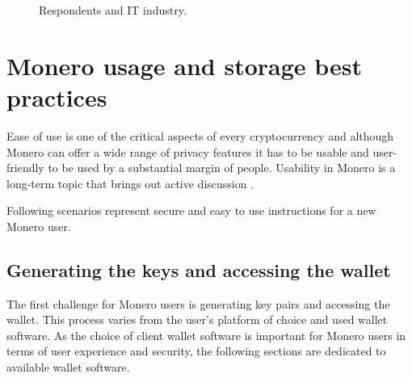 \documentclass[
  printed, %
  table,   %
  lof,     %
  lot,     %
           oneside, color
]{fithesis3}
\begin{document}
\begin{center}
\begin{figure}[H]
\caption{Respondents and IT industry.}
\label{chart:itindustryuserresearch}\end{figure}\end{center}

\chapter{Monero usage and storage best practices}
Ease of use is one of the critical aspects of every cryptocurrency and although Monero can offer a wide range of privacy features it has to be usable and user-friendly to be used by a substantial margin of people. Usability in Monero is a long-term topic that brings out active discussion \cite{monerolang2018}.

Following scenarios represent secure and easy to use instructions for a new Monero user.

\section{Generating the keys and accessing the wallet}
The first challenge for Monero users is generating key pairs and accessing the wallet. This process varies from the user's platform of choice and used wallet software. As the choice of client wallet software is important for Monero users in terms of user experience and security, the following sections are dedicated to available wallet software. %
\end{document}
